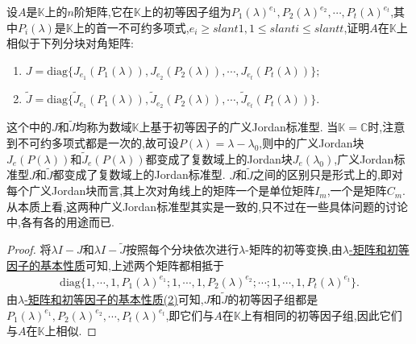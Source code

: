 \documentclass[../../main.tex]{subfiles}
\begin{document}
\begin{proposition}\label{proposition:广义标准型理论相关结论1}
设$A$是$\mathbb{K}$上的$n$阶矩阵,它在$\mathbb{K}$上的初等因子组为$P_1(\lambda)^{e_1},P_2(\lambda)^{e_2},\cdots,P_t(\lambda)^{e_t}$,其中$P_i(\lambda)$是$\mathbb{K}$上的首一不可约多项式,$e_i\geqslant slant 1, 1\leqslant slant i\leqslant slant t$,证明$A$在$\mathbb{K}$上相似于下列分块对角矩阵:
\begin{enumerate}[(1)]
\item $J = \mathrm{diag}\{J_{e_1}(P_1(\lambda)),J_{e_2}(P_2(\lambda)),\cdots,J_{e_t}(P_t(\lambda))\};$

\item $\widetilde{J} = \mathrm{diag}\{\widetilde{J}_{e_1}(P_1(\lambda)),\widetilde{J}_{e_2}(P_2(\lambda)),\cdots,\widetilde{J}_{e_t}(P_t(\lambda))\}.$
\end{enumerate}
\end{proposition}
\begin{remark}
这个中的$J$和$\widetilde{J}$均称为数域$\mathbb{K}$上基于初等因子的广义Jordan标准型. 当$\mathbb{K}=\mathbb{C}$时,注意到不可约多项式都是一次的,故可设$P(\lambda)=\lambda - \lambda_0$,则中的广义Jordan块$J_e(P(\lambda))$和$\widetilde{J}_e(P(\lambda))$都变成了复数域上的Jordan块$J_e(\lambda_0)$,广义Jordan标准型$J$和$\widetilde{J}$都变成了复数域上的Jordan标准型. $J$和$\widetilde{J}$之间的区别只是形式上的,即对每个广义Jordan块而言,其上次对角线上的矩阵一个是单位矩阵$I_m$,一个是矩阵$C_m$. 从本质上看,这两种广义Jordan标准型其实是一致的,只不过在一些具体问题的讨论中,各有各的用途而已. 
\end{remark}
\begin{proof}
将$\lambda I - J$和$\lambda I - \widetilde{J}$按照每个分块依次进行$\lambda$-矩阵的初等变换,由\hyperref[theorem:lambda-矩阵和初等因子的基本性质]{$\lambda$-矩阵和初等因子的基本性质}可知,上述两个矩阵都相抵于
\begin{align*}
\mathrm{diag}\{1,\cdots,1,P_1(\lambda)^{e_1};1,\cdots,1,P_2(\lambda)^{e_2};\cdots;1,\cdots,1,P_t(\lambda)^{e_t}\}.
\end{align*}
由\hyperref[theorem:lambda-矩阵和初等因子的基本性质]{$\lambda$-矩阵和初等因子的基本性质(2)}可知,$J$和$\widetilde{J}$的初等因子组都是$P_1(\lambda)^{e_1},P_2(\lambda)^{e_2},\cdots,P_t(\lambda)^{e_t}$,即它们与$A$在$\mathbb{K}$上有相同的初等因子组,因此它们与$A$在$\mathbb{K}$上相似. 
\end{proof}
\end{document}
